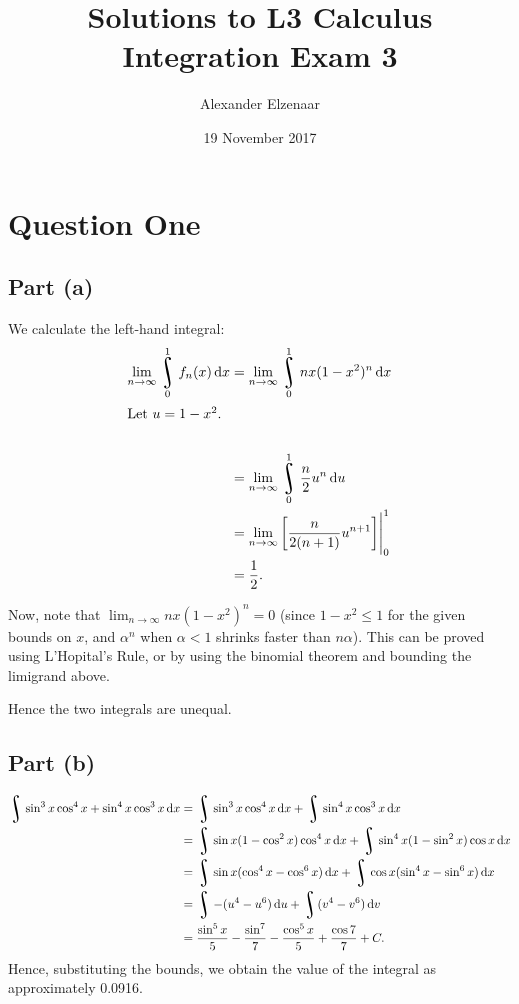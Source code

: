 \documentclass[a4paper]{report}
\title{Solutions to L3 Calculus Integration Exam 3}
\author{Alexander Elzenaar}
\date{19 November 2017}
\DeclareMathOperator*{\rint}{\scalerel*{\rotatebox{17}{$\!\int\!$}}{\int}}
\begin{document}
\maketitle

\section*{Question One}
\subsection*{Part (a)}
We calculate the left-hand integral:
\begin{align*}
  \lim_{n \to \infty} \rint_0^1 f_n(x) \dif{x} &= \lim_{n \to\infty} \rint^1_0 nx(1 - x^2)^n \dif{x}\\
  \intertext{Let $ u = 1 - x^2 $.}\\
                                               &= \lim_{n \to\infty} \rint^1_0 \frac{n}{2} u^n \dif{u}\\
                                               &= \lim_{n \to\infty} \eval{\left[\frac{n}{2(n+1)} u^{n + 1}\right]}_0^1\\
                                               &= \frac{1}{2}.
\end{align*}

Now, note that $ \lim_{n \to\infty} nx(1 - x^2)^n = 0 $ (since $ 1 - x^2 \leq 1 $ for the given bounds on $ x $, and $ \alpha^n $ when $ \alpha < 1 $
shrinks faster than $ n\alpha $). This can be proved using L'Hopital's Rule, or by using the binomial theorem and bounding the limigrand above.

Hence the two integrals are unequal.

\subsection*{Part (b)}
\begin{align*}
  \rint \sin^3 x \cos^4 x + \sin^4 x \cos^3 x \dif{x} &= \rint \sin^3 x \cos^4 x \dif{x} + \rint \sin^4 x \cos^3 x \dif{x}\\
                                                      &= \rint \sin x (1 - \cos^2 x) \cos^4 x \dif{x} + \rint \sin^4 x (1 - \sin^2 x)\cos x \dif{x}\\
                                                      &= \rint \sin x (\cos^4 x - \cos^6 x) \dif{x} + \rint \cos x (\sin^4 x - \sin^6 x) \dif{x}\\
                                                      &= \rint -(u^4 - u^6) \dif{u} + \rint (v^4 - v^6) \dif{v}\\
                                                      &= \frac{\sin^5 x}{5} - \frac{\sin^7}{7} - \frac{\cos^5 x}{5} + \frac{\cos 7}{7} + C.
\end{align*}
Hence, substituting the bounds, we obtain the value of the integral as approximately 0.0916.
\end{document}
